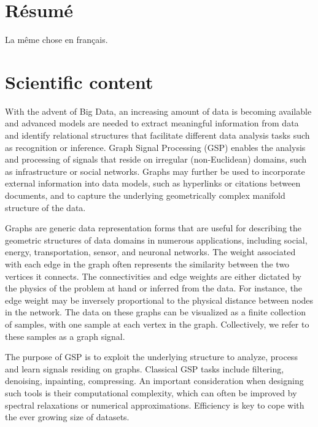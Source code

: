 \documentclass[a4paper]{scrartcl}
\begin{document}
\section{Résumé}

La même chose en français.


\section{Scientific content}

With the advent of Big Data, an increasing amount of data is becoming available
and advanced models are needed to extract meaningful information from data and
identify relational structures that facilitate different data analysis tasks
such as recognition or inference. Graph Signal Processing (GSP) enables the
analysis and processing of signals that reside on irregular (non-Euclidean)
domains, such as infrastructure or social networks. Graphs may further be used
to incorporate external information into data models, such as hyperlinks or
citations between documents, and to capture the underlying geometrically complex
manifold structure of the data. 

Graphs are generic data representation forms that are useful for describing the
geometric structures of data domains in numerous applications, including social,
energy, transportation, sensor, and neuronal networks.
The weight associated with each edge in the graph often represents the
similarity between the two vertices it connects. The connectivities and edge
weights are either dictated by the physics of the problem at hand or inferred
from the data. For instance, the edge weight may be inversely proportional to
the physical distance between nodes in the network.
The data on these graphs can be visualized as a finite collection of samples,
with one sample at each vertex in the graph. Collectively, we refer to these
samples as a graph signal. 

The purpose of GSP is to exploit the underlying structure to analyze, process
and learn signals residing on graphs. 
Classical GSP tasks
include filtering, denoising, inpainting, compressing. An important
consideration when designing such tools is their computational complexity, which
can often be improved by spectral relaxations or numerical approximations.
Efficiency is key to cope with the ever growing size of datasets.

\end{document}
